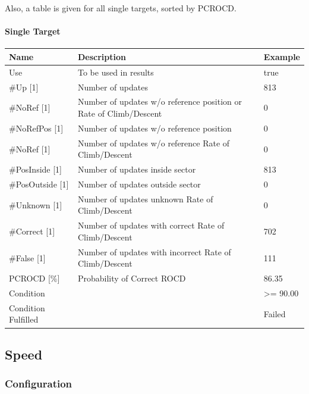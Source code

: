 Also, a table is given for all single targets, sorted by PCROCD.

\paragraph{Single Target}

\begin{center}
 \begin{table}[H]
  \begin{tabularx}{\textwidth}{ | l | X |  l | }
    \hline
    \textbf{Name} & \textbf{Description} & \textbf{Example} \\ \hline
    Use & To be used in results & true \\ \hline
    \#Up [1] & Number of updates & 813 \\ \hline
    \#NoRef [1] & Number of updates w/o reference position or Rate of Climb/Descent & 0 \\ \hline
    \#NoRefPos [1] & Number of updates w/o reference position  & 0 \\ \hline
    \#NoRef [1] & Number of updates w/o reference Rate of Climb/Descent & 0 \\ \hline
    \#PosInside [1] & Number of updates inside sector & 813 \\ \hline
    \#PosOutside [1] & Number of updates outside sector & 0 \\ \hline
    \#Unknown [1] & Number of updates unknown Rate of Climb/Descent & 0 \\ \hline
    \#Correct [1] & Number of updates with correct Rate of Climb/Descent & 702 \\ \hline
    \#False [1] & Number of updates with incorrect Rate of Climb/Descent & 111 \\ \hline
    PCROCD [\%] & Probability of Correct ROCD & 86.35 \\ \hline
    Condition &  & >= 90.00 \\ \hline
    Condition Fulfilled &  & Failed \\ \hline
\end{tabularx}
\end{table}
\end{center}

\subsection{Speed}
\label{sec:eval_req_speed} 

\subsubsection{Configuration}

